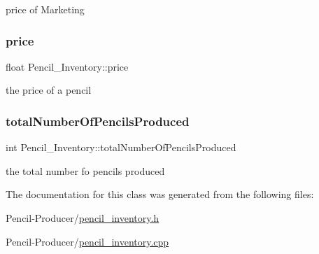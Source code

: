 price of Marketing 

\mbox{\label{classPencil__Inventory_a833632ab57afc00b148d106c43a6729e}} 
\subsubsection{\texorpdfstring{price}{price}}
{\footnotesize\ttfamily float Pencil\+\_\+\+Inventory\+::price\hspace{0.3cm}{\ttfamily [private]}}



the price of a pencil 

\mbox{\label{classPencil__Inventory_ac7f37f56e5e1a630cf24e436aac27cee}} 
\subsubsection{\texorpdfstring{totalNumberOfPencilsProduced}{totalNumberOfPencilsProduced}}
{\footnotesize\ttfamily int Pencil\+\_\+\+Inventory\+::total\+Number\+Of\+Pencils\+Produced\hspace{0.3cm}{\ttfamily [private]}}



the total number fo pencils produced 



The documentation for this class was generated from the following files\+:\begin{DoxyCompactItemize}
\item 
Pencil-\/\+Producer/\mbox{\hyperlink{pencil__inventory_8h}{pencil\+\_\+inventory.\+h}}\item 
Pencil-\/\+Producer/\mbox{\hyperlink{pencil__inventory_8cpp}{pencil\+\_\+inventory.\+cpp}}\end{DoxyCompactItemize}
